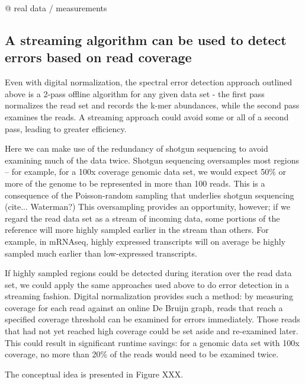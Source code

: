 \documentclass{article}
\begin{document}
@ real data / measurements

\subsection{A streaming algorithm can be used to detect errors based on read coverage}

Even with digital normalization, the spectral error detection approach
outlined above is a 2-pass offline algorithm for any given data set -
the first pass normalizes the read set and records the k-mer
abundances, while the second pass examines the reads.  A streaming
approach could avoid some or all of a second pass, leading to
greater efficiency.

Here we can make use of the redundancy of shotgun sequencing to avoid
examining much of the data twice. Shotgun
sequencing oversamples most regions -- for example, for a 100x
coverage genomic data set, we would expect 50\% or more of the genome
to be represented in more than 100 reads.  This is a consequence of
the Poisson-random sampling that underlies shotgun sequencing
(cite... Waterman?)  This oversampling provides an opportunity,
however; if we regard the read data set as a stream of incoming data,
some portions of the reference will more highly sampled earlier in the
stream than others.  For example, in mRNAseq, highly expressed
transcripts will on average be highly sampled much earlier than
low-expressed transcripts.

If highly sampled regions could be detected during iteration over the
read data set, we could apply the same approaches used above to do
error detection in a streaming fashion.  Digital normalization
provides such a method: by measuring coverage for each read against an
online De Bruijn graph, reads that reach a specified coverage
threshold can be examined for errors immediately.  Those reads that
had not yet reached high coverage could be set aside and re-examined
later.  This could result in significant runtime savings: for a
genomic data set with 100x coverage, no more than 20\% of the reads
would need to be examined twice.

The conceptual idea is presented in Figure XXX.
\end{document}
